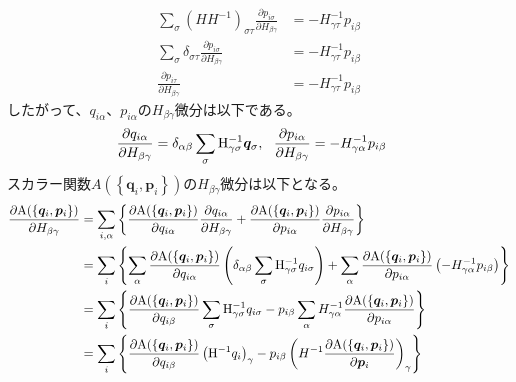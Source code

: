 \documentclass[11pt,a4paper,uplatex]{jsarticle}
\begin{document}
\begin{align}
    \sum_{\sigma} \left( H H^{-1} \right)_{\sigma \tau}  \frac{\partial  p_{i \sigma}}{\partial H_{\beta \gamma}} &= - H^{-1}_{\gamma \tau} p_{i \beta}  \\%
    \sum_{\sigma} \delta_{\sigma \tau}  \frac{\partial  p_{i \sigma}}{\partial H_{\beta \gamma}} &= - H^{-1}_{\gamma \tau} p_{i \beta}  \\%
    \frac{\partial  p_{i \tau}}{\partial H_{\beta \gamma}} &= - H^{-1}_{\gamma \tau} p_{i \beta}  %
\end{align}
したがって、$q_{i\alpha}$、$p_{i\alpha}$の$H_{\beta \gamma}$微分は以下である。
\begin{align}
    \frac{\partial q_{i \alpha}}{\partial H_{\beta \gamma}} 
    &= \delta_{\alpha \beta} \sum_{\sigma} {\rm H}^{-1}_{\gamma \sigma} \bm{q}_{\sigma}, \ \
    \frac{\partial  p_{i \alpha}}{\partial H_{\beta \gamma}} = - H^{-1}_{\gamma \alpha} p_{i \beta}  
\end{align}
スカラー関数$A\left(\left\{ \bm{q}_{i}, \bm{p}_{i} \right\}\right)$の$H_{\beta \gamma}$微分は以下となる。
\begin{align}
    \frac{\partial {\rm A}(\{\bm{q}_{i}, \bm{p}_{i}\})}{\partial H_{\beta \gamma}}  &= \sum_{i, \alpha} \left\{ \frac{\partial {\rm A}(\{\bm{q}_{i}, \bm{p}_{i}\})}{\partial q_{i \alpha}} \frac{\partial q_{i \alpha}}{\partial H_{\beta \gamma}} 
    +  \frac{\partial {\rm A}(\{\bm{q}_{i}, \bm{p}_{i}\})}{\partial p_{i \alpha}} \frac{\partial p_{i \alpha}}{\partial H_{\beta \gamma}} \right\} \\
    &= \sum_{i} \left\{ \sum_{\alpha} \frac{\partial {\rm A}(\{\bm{q}_{i}, \bm{p}_{i}\})}{\partial q_{i \alpha}} \left( \delta_{\alpha \beta} \sum_{\sigma} {\rm H}^{-1}_{\gamma \sigma} q_{i \sigma} \right) + \sum_{\alpha} \frac{\partial {\rm A}(\{\bm{q}_{i}, \bm{p}_{i}\})}{\partial p_{i \alpha}} \left(-H_{\gamma \alpha}^{-1} p_{i\beta} \right) \right\} \\
    &= \sum_{i} \left\{ \frac{\partial {\rm A}(\{\bm{q}_{i}, \bm{p}_{i}\})}{\partial q_{i \beta}} \sum_{\sigma} {\rm H}^{-1}_{\gamma \sigma} q_{i \sigma} 
    -  p_{i\beta} \sum_{\alpha} H_{\gamma \alpha}^{-1} \frac{\partial {\rm A}(\{\bm{q}_{i}, \bm{p}_{i}\})}{\partial p_{i \alpha}} \right\} \\
    &= \sum_{i} \left\{ \frac{\partial {\rm A}(\{\bm{q}_{i}, \bm{p}_{i}\})}{\partial q_{i \beta}} \left({\rm H}^{-1} q_{i}\right)_{\gamma}
    -  p_{i \beta} \left( H^{-1} \frac{\partial {\rm A}(\{\bm{q}_{i}, \bm{p}_{i}\})}{\partial \bm{p}_{i}}  \right)_{\gamma} \right\}
\end{align}
\end{document}
